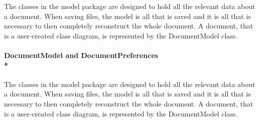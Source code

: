
\tab The classes in the model package are designed to hold all the relevant data about a
document. When saving files, the model is all that is saved and it is all that is
necessary to then completely reconstruct the whole document. A document, that is a
user-created class diagram, is represented by the DocumentModel class. 
	
\paragraph{\small{\tab DocumentModel and DocumentPreferences\\*}}

\hspace{-10pt}The classes in the model package are designed to hold all the relevant data about a
document. When saving files, the model is all that is saved and it is all that is
necessary to then completely reconstruct the whole document. A document, that is a
user-created class diagram, is represented by the DocumentModel class. 